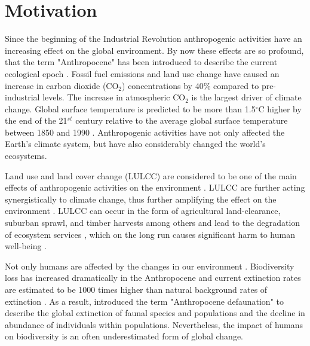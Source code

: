 \documentclass[12pt,a4paper, twoside, english]{article}
\begin{document}
\newpage
{}
\section{Motivation}

Since the beginning of the Industrial Revolution anthropogenic activities have an increasing effect on the global environment. By now these effects are so profound, that the term "Anthropocene" has been introduced to describe the current ecological epoch \citep{Crutzen2002, Steffen2007, Lewis2015, Corlett2015}. Fossil fuel emissions and land use change have caused an increase in carbon dioxide (CO$_{2}$) concentrations by 40\% compared to pre-industrial levels. The increase in atmospheric CO$_{2}$ is the largest driver of climate change. Global surface temperature is predicted to be more than 1.5$^{\circ}$C higher by the end of the 21$^{st}$ century relative to the average global surface temperature between 1850 and 1990 \citep{IPCC2013}. Anthropogenic activities have not only affected the Earth's climate system, but have also considerably changed the world's ecosystems. 

Land use and land cover change (LULCC) are considered to be one of the main effects of anthropogenic activities on the environment \citep{Foley2005, Burkhard2012}. LULCC are further acting synergistically to climate change, thus further amplifying the effect on the environment \citep{Lambin2001, Opdam2004}. LULCC can occur in the form of agricultural land-clearance, suburban sprawl, and timber harvests among others \citep{Lambin2001} and lead to the degradation of ecosystem services \citep{Burkhard2012}, which on the long run causes significant harm to human well-being \citep{MEA2005}. 

Not only humans are affected by the changes in our environment \citep{Pereira2010}. Biodiversity loss has increased dramatically in the Anthropocene and current extinction rates are estimated to be 1000 times higher than natural background rates of extinction \citep{DeVos2015}. As a result, \cite{Dirzo2014} introduced the term "Anthropocene defaunation" to describe the global extinction of faunal species and populations and the decline in abundance of individuals within populations. Nevertheless, the impact of humans on biodiversity is an often underestimated form of global change. 
\end{document}
